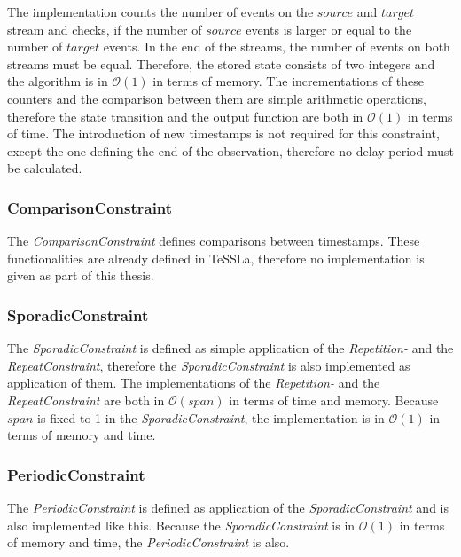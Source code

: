 	The implementation counts the number of events on the $source$ and $target$ stream and checks, if the number of $source$ events is larger or equal to the number of $target$ events. In the end of the streams, the number of events on both streams must be equal. Therefore, the stored state consists of two integers and the algorithm is in $\mathcal{O}(1)$ in terms of memory. The incrementations of these counters and the comparison between them are simple arithmetic operations, therefore the state transition and the output function are both in $\mathcal{O}(1)$ in terms of time. The introduction of new timestamps is not required for this constraint, except the one defining the end of the observation, therefore no delay period must be calculated.
	
\subsubsection{ComparisonConstraint}
	The \emph{ComparisonConstraint} defines comparisons between timestamps. These functionalities are already defined in TeSSLa, therefore no implementation is given as part of this thesis.  
	
\subsubsection{SporadicConstraint}
	The \emph{SporadicConstraint} is defined as simple application of the \emph{Repetition-} and the \emph{RepeatConstraint}, therefore the \emph{SporadicConstraint} is also implemented as application of them. The implementations of the \emph{Repetition-} and the \emph{RepeatConstraint} are both in $\mathcal{O}(span)$ in terms of time and memory. Because $span$ is fixed to 1 in the \textit{SporadicConstraint}, the implementation is in $\mathcal{O}(1)$ in terms of memory and time.
	
\subsubsection{PeriodicConstraint}
	The \emph{PeriodicConstraint} is defined as application of the \emph{SporadicConstraint} and is also implemented like this. Because the \emph{SporadicConstraint} is in $\mathcal{O}(1)$ in terms of memory and time, the \emph{PeriodicConstraint} is also.
	
